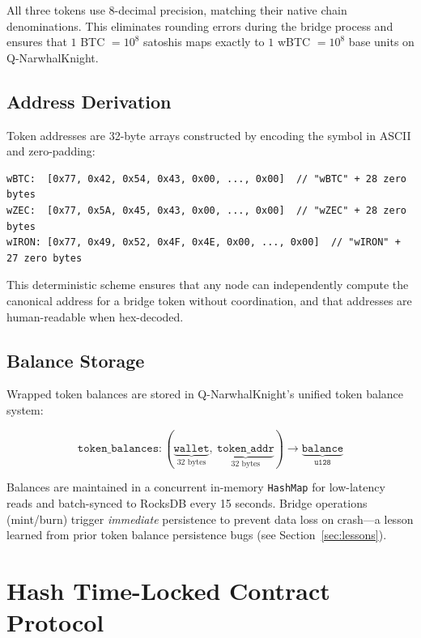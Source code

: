 \documentclass[11pt,a4paper]{article}
\begin{document}
All three tokens use 8-decimal precision, matching their native chain denominations. This eliminates rounding errors during the bridge process and ensures that $1$ BTC $= 10^8$ satoshis maps exactly to $1$ wBTC $= 10^8$ base units on Q-NarwhalKnight.

\subsection{Address Derivation}

Token addresses are 32-byte arrays constructed by encoding the symbol in ASCII and zero-padding:

\begin{lstlisting}[language={}]
wBTC:  [0x77, 0x42, 0x54, 0x43, 0x00, ..., 0x00]  // "wBTC" + 28 zero bytes
wZEC:  [0x77, 0x5A, 0x45, 0x43, 0x00, ..., 0x00]  // "wZEC" + 28 zero bytes
wIRON: [0x77, 0x49, 0x52, 0x4F, 0x4E, 0x00, ..., 0x00]  // "wIRON" + 27 zero bytes
\end{lstlisting}

This deterministic scheme ensures that any node can independently compute the canonical address for a bridge token without coordination, and that addresses are human-readable when hex-decoded.

\subsection{Balance Storage}

Wrapped token balances are stored in Q-NarwhalKnight's unified token balance system:

\begin{equation}
    \texttt{token\_balances}: (\underbrace{\texttt{wallet}}_{\text{32 bytes}},\ \underbrace{\texttt{token\_addr}}_{\text{32 bytes}}) \longrightarrow \underbrace{\texttt{balance}}_{\texttt{u128}}
\end{equation}

Balances are maintained in a concurrent in-memory \texttt{HashMap} for low-latency reads and batch-synced to RocksDB every 15 seconds. Bridge operations (mint/burn) trigger \emph{immediate} persistence to prevent data loss on crash---a lesson learned from prior token balance persistence bugs (see Section~\ref{sec:lessons}).

\section{Hash Time-Locked Contract Protocol}
\end{document}
